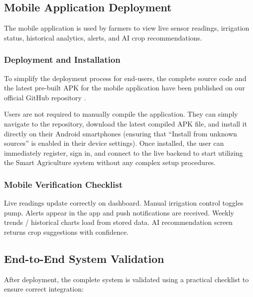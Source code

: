 \subsection{Mobile Application Deployment}
\label{subsec:mobile-deployment}

The mobile application is used by farmers to view live sensor readings, irrigation status, historical analytics, alerts, and AI crop recommendations.

\subsubsection{Deployment and Installation}
To simplify the deployment process for end-users, the complete source code and the latest pre-built APK for the mobile application have been published on our official GitHub repository \cite{smart_agri_github}. 

Users are not required to manually compile the application. They can simply navigate to the repository, download the latest compiled APK file, and install it directly on their Android smartphones (ensuring that ``Install from unknown sources'' is enabled in their device settings). Once installed, the user can immediately register, sign in, and connect to the live backend to start utilizing the Smart Agriculture system without any complex setup procedures.

\subsubsection{Mobile Verification Checklist}
Live readings update correctly on dashboard. Manual irrigation control toggles pump. Alerts appear in the app and push notifications are received. Weekly trends / historical charts load from stored data. AI recommendation screen returns crop suggestions with confidence.


\subsection{End-to-End System Validation}
\label{sec:e2e-validation}

After deployment, the complete system is validated using a practical checklist to ensure correct integration:

